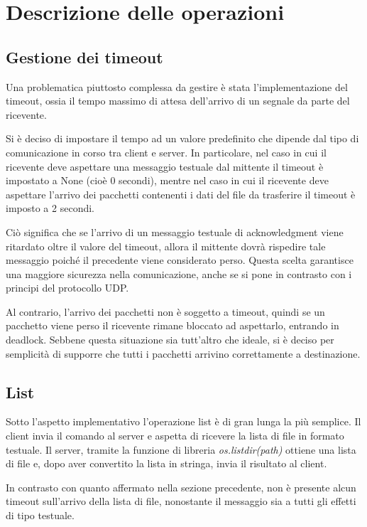 \documentclass[a4paper,12pt]{report}
\begin{document}
\section{Descrizione delle operazioni}

\subsection{Gestione dei timeout}
Una problematica piuttosto complessa da gestire è stata l'implementazione del timeout, ossia il tempo massimo di attesa dell'arrivo di un segnale da parte del ricevente. 

Si è deciso di impostare il tempo ad un valore predefinito che dipende dal tipo di comunicazione in corso tra client e server.
In particolare, nel caso in cui il ricevente deve aspettare una messaggio testuale dal mittente il timeout è impostato a None (cioè 0 secondi), mentre nel caso in cui il ricevente deve aspettare l'arrivo dei pacchetti contenenti i dati del file da trasferire il timeout è imposto a 2 secondi.

Ciò significa che se l'arrivo di un messaggio testuale di acknowledgment viene ritardato oltre il valore del timeout, allora il mittente dovrà rispedire tale messaggio poiché il precedente viene considerato perso. Questa scelta garantisce una maggiore sicurezza nella comunicazione, anche se si pone in contrasto con i principi del protocollo UDP. 

Al contrario, l'arrivo dei pacchetti non è soggetto a timeout, quindi se un pacchetto viene perso il ricevente rimane bloccato ad aspettarlo, entrando in deadlock. Sebbene questa situazione sia tutt'altro che ideale, si è deciso per semplicità di supporre che tutti i pacchetti arrivino correttamente a destinazione.

\subsection{List}
Sotto l'aspetto implementativo l'operazione list è di gran lunga la più semplice. Il client invia il comando al server e aspetta di ricevere la lista di file in formato testuale. Il server, tramite la funzione di libreria \textit{os.listdir(path)} ottiene una lista di file e, dopo aver convertito la lista in stringa, invia il risultato al client.

In contrasto con quanto affermato nella sezione precedente, non è presente alcun timeout sull'arrivo della lista di file, nonostante il messaggio sia a tutti gli effetti di tipo testuale.
\end{document}
